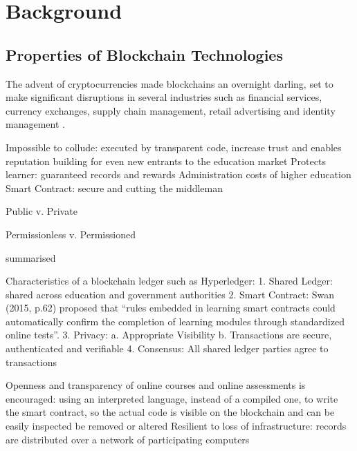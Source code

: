 
\chapter{Background}

    \graphicspath{{Chapter2/Figs/Raster/}{Chapter2/Figs/PDF/}{Chapter2/Figs/}}

\section{Properties of Blockchain Technologies}

The advent of cryptocurrencies made blockchains an overnight darling, set to make significant disruptions 
in several industries such as financial services, currency exchanges, supply chain management, retail 
advertising and identity management \citep{forbes2017industries}.

Impossible to collude: executed by transparent code, increase trust and enables reputation building for even new entrants to 
the education market
Protects learner: guaranteed records and rewards
Administration costs of higher education
Smart Contract: secure and cutting the middleman

Public v. Private 

Permissionless v. Permissioned

\citet{wust2017you} summarised  


Characteristics of a blockchain ledger such as Hyperledger:
1. Shared Ledger: 
shared across education and government authorities
2. Smart Contract: 
Swan (2015, p.62) proposed that “rules embedded in learning smart contracts could automatically confirm the completion of learning modules 
through standardized online tests”.
3. Privacy: 
a. Appropriate Visibility
b. Transactions are secure, authenticated and verifiable
4. Consensus: All shared ledger parties agree to transactions

Openness and transparency of online courses and online assessments is encouraged: using an interpreted language, instead of a compiled 
one, to write the smart contract, so the actual code is visible on the blockchain and can be easily inspected
be removed or altered
Resilient to loss of infrastructure: records are distributed over a network of participating computers


